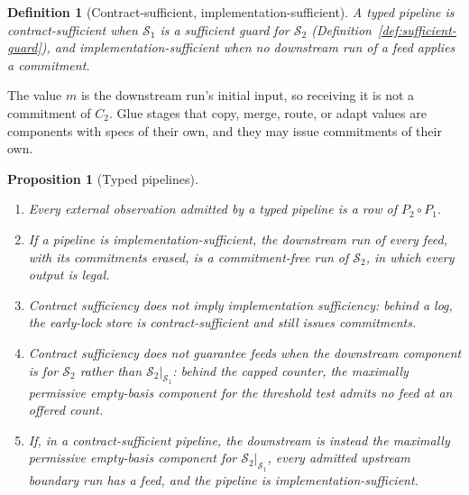 \documentclass[sigconf]{cidr-2027}
\newtheorem{proposition}{Proposition}
\newtheorem{definition}{Definition}
\theoremstyle{remark}
\newcommand{\commitment}{commitment\xspace}
\newcommand{\commitments}{commitments\xspace}
\newcommand{\Spec}{\mathcal{S}}
\begin{document}
\begin{definition}[Contract-sufficient, implementation-sufficient]
\label{def:sufficient-pipeline}
A typed pipeline is \emph{contract-sufficient} when $\Spec_1$ is a sufficient
guard for $\Spec_2$ (Definition~\ref{def:sufficient-guard}), and
\emph{implementation-sufficient} when no downstream run of a feed applies a
\commitment.
\end{definition}

The value $m$ is the downstream run's initial input, so receiving it is not
a \commitment of $C_2$. Glue stages that copy, merge, route, or adapt values
are components with specs of their own, and they may issue \commitments of
their own.

\begin{proposition}[Typed pipelines]
\label{prop:typed-pipelines}
\leavevmode
\begin{enumerate}
\item
Every external observation admitted by a typed pipeline is a row of
      $P_2\circ P_1$.
\item
If a pipeline is implementation-sufficient, the downstream run of every
      feed, with its \commitments erased, is a \commitment-free run of
      $\Spec_2$, in which every output is legal.
\item
Contract sufficiency does not imply implementation sufficiency: behind a
      log, the early-lock store is contract-sufficient and still issues
      \commitments.
\item
Contract sufficiency does not guarantee feeds when the downstream
      component is for $\Spec_2$ rather than $\Spec_2|_{\Spec_1}$: behind the
      capped counter, the maximally permissive empty-basis component for the
      threshold test admits no feed at an offered count.
\item
If, in a contract-sufficient pipeline, the downstream is instead the
      maximally permissive empty-basis component for $\Spec_2|_{\Spec_1}$,
      every admitted upstream boundary run has a feed, and the pipeline is
      implementation-sufficient.
\end{enumerate}
\end{proposition}
\end{document}
